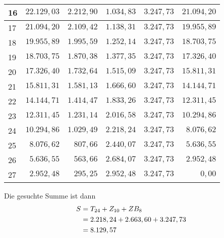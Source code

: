 \documentclass{article}
\begin{document}
\begin{center}
\begin{tabular}{l|r|r|r|r|r}
			\hline 16 & $22.129,03 $ & $2.212,90 $ & $1.034,83 $ & $3.247,73 $ & $21.094,20 $ \\
			\hline 17 & $21.094,20 $ & $2.109,42 $ & $1.138,31 $ & $3.247,73 $ & $19.955,89 $ \\
			\hline 18 & $19.955,89 $ & $1.995,59 $ & $1.252,14 $ & $3.247,73 $ & $18.703,75 $ \\
			\hline 19 & $18.703,75 $ & $1.870,38 $ & $1.377,35 $ & $3.247,73 $ & $17.326,40 $ \\
			\hline 20 & $17.326,40 $ & $1.732,64 $ & $1.515,09 $ & $3.247,73 $ & $15.811,31 $ \\
			\hline 21 & $15.811,31 $ & $1.581,13 $ & $1.666,60 $ & $3.247,73 $ & $14.144,71 $ \\
			\hline 22 & $14.144,71 $ & $1.414,47 $ & $1.833,26 $ & $3.247,73 $ & $12.311,45 $ \\
			\hline 23 & $12.311,45 $ & $1.231,14 $ & $2.016,58 $ & $3.247,73 $ & $10.294,86 $ \\
			\hline 24 & $10.294,86 $ & $1.029,49 $ & $2.218,24 $ & $3.247,73 $ & $8.076,62 $ \\
			\hline 25 & $8.076,62 $ & $807,66 $ & $2.440,07 $ & $3.247,73 $ & $5.636,55 $ \\
			\hline 26 & $5.636,55 $ & $563,66 $ & $2.684,07 $ & $3.247,73 $ & $2.952,48 $ \\
			\hline 27 & $2.952,48 $ & $295,25 $ & $2.952,48 $ & $3.247,73 $ & $0,00 $
		\end{tabular}
	\end{center}
	Die gesuchte Summe ist dann
	\begin{align}
		S &= T_{24} + Z_{10} + ZB_8 \notag \\
		&= 2.218,24 + 2.663,60 + 3.247,73 \notag \\
		&= 8.129,57 \notag
	\end{align}
\end{document}
